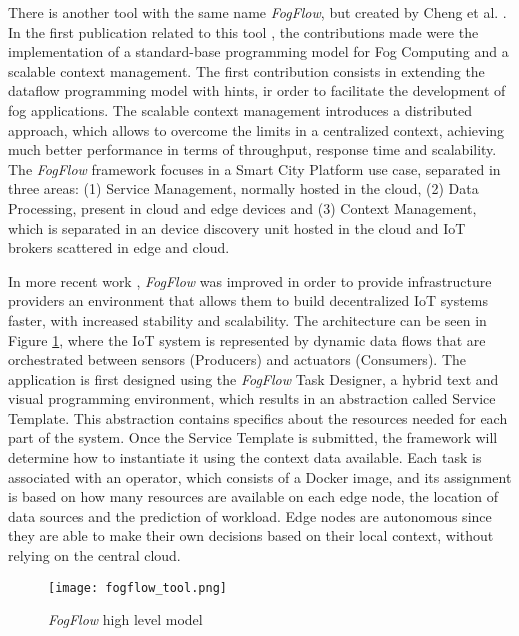 \par There is another tool with the same name \textit{FogFlow}, but created by Cheng et al. \cite{fogflow_github}. In the first publication related to this tool \cite{fog_flow_easy}, the contributions made were the implementation of a standard-base programming model for Fog Computing and a scalable context management. The first contribution consists in extending the dataflow programming model with hints, ir order to facilitate the development of fog applications. The scalable context management introduces a distributed approach, which allows to overcome the limits in a centralized context, achieving much better performance in terms of throughput, response time and scalability. The \textit{FogFlow} framework focuses in a Smart City Platform use case, separated in three areas: (1) Service Management, normally hosted in the cloud, (2) Data Processing, present in cloud and edge devices and (3) Context Management, which is separated in an device discovery unit hosted in the cloud and IoT brokers scattered in edge and cloud.
\par In more recent work \cite{fog_flow_tool}, \textit{FogFlow} was improved in order to provide infrastructure providers an environment that allows them to build decentralized IoT systems faster, with increased stability and scalability. The architecture can be seen in Figure \ref{fig:fogflow_tool}, where the IoT system is represented by dynamic data flows that are orchestrated between sensors (Producers) and actuators (Consumers). The application is first designed using the \textit{FogFlow} Task Designer, a hybrid text and visual programming environment, which results in an abstraction called Service Template. This abstraction contains specifics about the resources needed for each part of the system. Once the Service Template is submitted, the framework will determine how to instantiate it using the context data available. Each task is associated with an operator, which consists of a Docker image, and its assignment is based on how many resources are available on each edge node, the location of data sources and the prediction of workload. Edge nodes are autonomous since they are able to make their own decisions based on their local context, without relying on the central cloud.

\begin{figure}[h]
\caption{\textit{FogFlow} high level model \cite{fog_flow_tool}}
\label{fig:fogflow_tool}
\centering
\texttt{[image: fogflow\_tool.png]}
\end{figure}

